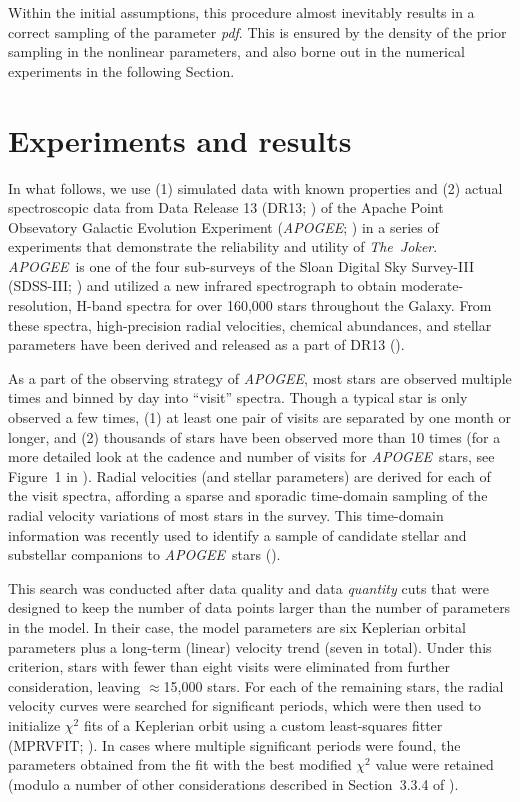 \documentclass[manuscript, letterpaper]{aastex6}
\newcommand{\project}[1]{\textsl{#1}}
\newcommand{\acronym}[1]{{\small{#1}}}
\newcommand{\apogee}{\project{\acronym{APOGEE}}}
\newcommand{\samplername}{\project{The~Joker}}
\newcommand{\sectionname}{Section}
\newcommand{\figname}{Figure}
\begin{document}
Within the initial assumptions, this procedure almost inevitably results in a
correct sampling of the parameter {\it pdf}. This is ensured by the density of the
prior sampling in the nonlinear parameters, and also borne out in the numerical experiments
in the following \sectionname.

\section{Experiments and results} \label{sec:experiments}

In what follows, we use (1) simulated data with known properties and (2) actual
spectroscopic data from Data Release 13 (DR13;
\citealt{SDSS-Collaboration:2016}) of the Apache Point Obsevatory Galactic
Evolution Experiment (\apogee; \citealt{Majewski:2015}) in a series of
experiments that demonstrate the reliability and utility of \samplername.
\apogee\ is one of the four sub-surveys of the Sloan Digital Sky Survey-III
(SDSS-III; \citealt{Eisenstein:2011}) and utilized a new infrared spectrograph
to obtain moderate-resolution, H-band spectra for over 160,000 stars throughout
the Galaxy.
From these spectra, high-precision radial velocities, chemical abundances, and
stellar parameters have been derived and released as a part of DR13
(\citealt{Holtzman:2015,Nidever:2015}).

As a part of the observing strategy of \apogee, most stars are observed
multiple times and binned by day into ``visit'' spectra.
Though a typical star is only observed a few times, (1) at least one pair of
visits are separated by one month or longer, and (2) thousands of stars have
been observed more than 10 times (for a more detailed look at the cadence and
number of visits for \apogee\ stars, see \figname~1 in \citealt{Troup:2016}).
Radial velocities (and stellar parameters) are derived for each of the visit
spectra, affording a sparse and sporadic time-domain sampling of the radial
velocity variations of most stars in the survey.
This time-domain information was recently used to identify a sample of
candidate stellar and substellar companions to \apogee\ stars
(\citealt{Troup:2016}).

This search was conducted after data quality and data \emph{quantity} cuts that
were designed to keep the number of data points larger than the number of
parameters in the model.
In their case, the model parameters are six Keplerian orbital parameters plus a
long-term (linear) velocity trend (seven in total).
Under this criterion, stars with fewer than eight visits were eliminated from further
consideration, leaving $\approx$15,000 stars.
For each of the remaining stars, the radial velocity curves were searched for
significant periods, which were then used to initialize $\chi^2$ fits of a
Keplerian orbit using a custom least-squares fitter (\acronym{MPRVFIT};
\citealt{De-Lee:2013}).
In cases where multiple significant periods were found, the parameters obtained
from the fit with the best modified $\chi^2$ value were retained (modulo a
number of other considerations described in \sectionname~3.3.4 of
\citealt{Troup:2016}).
\end{document}
